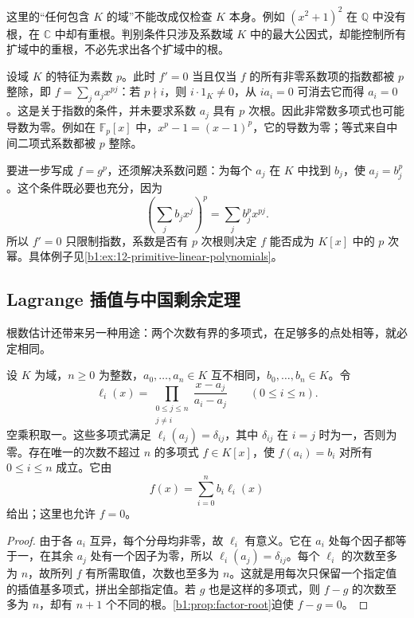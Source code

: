 这里的“任何包含 \(K\) 的域”不能改成仅检查 \(K\) 本身。例如 \((x^2+1)^2\) 在 \(\mathbb Q\) 中没有根，在 \(\mathbb C\) 中却有重根。判别条件只涉及系数域 \(K\) 中的最大公因式，却能控制所有扩域中的重根，不必先求出各个扩域中的根。

\ProseParagraphBreak
设域 \(K\) 的特征为素数 \(p\)。此时 \(f'=0\) 当且仅当 \(f\) 的所有非零系数项的指数都被 \(p\) 整除，即 \(f=\sum_j a_jx^{pj}\)：若 \(p\nmid i\)，则 \(i\cdot1_K\ne0\)，从 \(ia_i=0\) 可消去它而得 \(a_i=0\)。这是关于指数的条件，并未要求系数 \(a_j\) 具有 \(p\) 次根。因此非常数多项式也可能导数为零。例如在 \(\mathbb F_p[x]\) 中，\(x^p-1=(x-1)^p\)，它的导数为零；等式来自中间二项式系数都被 \(p\) 整除。

\ProseParagraphBreak
要进一步写成 \(f=g^p\)，还须解决系数问题：为每个 \(a_j\) 在 \(K\) 中找到 \(b_j\)，使 \(a_j=b_j^p\)。这个条件既必要也充分，因为
\[
	\left(\sum_j b_jx^j\right)^p=\sum_j b_j^px^{pj}.
\]
所以 \(f'=0\) 只限制指数，系数是否有 \(p\) 次根则决定 \(f\) 能否成为 \(K[x]\) 中的 \(p\) 次幂。具体例子见\cref{b1:ex:12-primitive-linear-polynomials}。

\subsection{Lagrange 插值与中国剩余定理}
\label{b1:subsec:1201:03}

根数估计还带来另一种用途：两个次数有界的多项式，在足够多的点处相等，就必定相同。

\begin{theorem}[Lagrange 插值]\label{b1:thm:lagrange-interpolation}
	设 \(K\) 为域，\(n\geq0\) 为整数，\(a_0,\ldots,a_n\in K\) 互不相同，\(b_0,\ldots,b_n\in K\)。令
	\[
		\ell_i(x)=\prod_{\substack{0\le j\le n\\j\ne i}}\frac{x-a_j}{a_i-a_j} \qquad(0\le i\le n).
	\]
	空乘积取一。这些多项式满足 \(\ell_i(a_j)=\delta_{ij}\)，其中 \(\delta_{ij}\) 在 \(i=j\) 时为一，否则为零。存在唯一的次数不超过 \(n\) 的多项式 \(f\in K[x]\)，使 \(f(a_i)=b_i\) 对所有 \(0\leq i\leq n\) 成立。它由
	\begin{equation}\label{b1:eq:lagrange-interpolation}
		f(x)=\sum_{i=0}^n b_i\ell_i(x)
	\end{equation}
	给出；这里也允许 \(f=0\)。
\end{theorem}
\begin{proof}
	由于各 \(a_i\) 互异，每个分母均非零，故 \(\ell_i\) 有意义。它在 \(a_i\) 处每个因子都等于一，在其余 \(a_j\) 处有一个因子为零，所以 \(\ell_i(a_j)=\delta_{ij}\)。每个 \(\ell_i\) 的次数至多为 \(n\)，故所列 \(f\) 有所需取值，次数也至多为 \(n\)。这就是用每次只保留一个指定值的插值基多项式，拼出全部指定值。若 \(g\) 也是这样的多项式，则 \(f-g\) 的次数至多为 \(n\)，却有 \(n+1\) 个不同的根。\cref{b1:prop:factor-root}迫使 \(f-g=0\)。
\end{proof}

